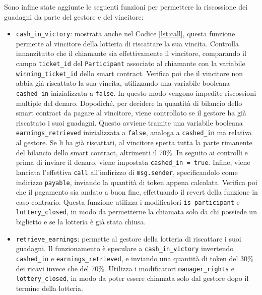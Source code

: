 \documentclass[12pt,a4paper,openright,twoside]{report}
\begin{document}
Sono infine state aggiunte le seguenti funzioni per permettere la riscossione dei guadagni da parte del gestore e del vincitore:
\begin{itemize}
    \item \label{cash_in}\texttt{cash\_in\_victory}: mostrata anche nel Codice \ref{lst:call}, questa funzione permette al vincitore della lotteria di riscattare la sua vincita. Controlla innanzitutto che il chiamante sia effettivamente il vincitore, comparando il campo \texttt{ticket\_id} del \texttt{Participant} associato al chiamante con la variabile \texttt{winning\_ticket\_id} dello smart contract. Verifica poi che il vincitore non abbia già riscattato la sua vincita, utilizzando una variabile booleana \texttt{cashed\_in} inizializzata a \texttt{false}. In questo modo vengono impedite riscossioni multiple del denaro. Dopodiché, per decidere la quantità di bilancio dello smart contract da pagare al vincitore, viene controllato se il gestore ha già riscattato i suoi guadagni. Questo avviene tramite una variabile booleana \texttt{earnings\_retrieved} inizializzata a \texttt{false}, analoga a \texttt{cashed\_in} ma relativa al gestore. Se li ha già riscattati, al vincitore spetta tutta la parte rimanente del bilancio dello smart contract, altrimenti il 70\%. In seguito ai controlli e prima di inviare il denaro, viene impostata \texttt{cashed\_in = true}. Infine, viene lanciata l'effettiva \texttt{call} all'indirizzo di \texttt{msg.sender}, specificandolo come indirizzo \texttt{payable}, inviando la quantità di token appena calcolata. Verifica poi che il pagamento sia andato a buon fine, effettuando il revert della funzione in caso contrario. Questa funzione utilizza i modificatori \texttt{is\_participant} e \texttt{lottery\_closed}, in modo da permetterne la chiamata solo da chi possiede un biglietto e se la lotteria è già stata chiusa.
    \item \texttt{retrieve\_earnings}: permette al gestore della lotteria di riscattare i suoi guadagni. Il funzionamento è speculare a \texttt{cash\_in\_victory} invertendo \texttt{cashed\_in} e \texttt{earnings\_retrieved}, e inviando una quantità di token del 30\% dei ricavi invece che del 70\%. Utilizza i modificatori \texttt{manager\_rights} e \texttt{lottery\_closed}, in modo da poter essere chiamata solo dal gestore dopo il termine della lotteria. 
\end{itemize}
\end{document}
